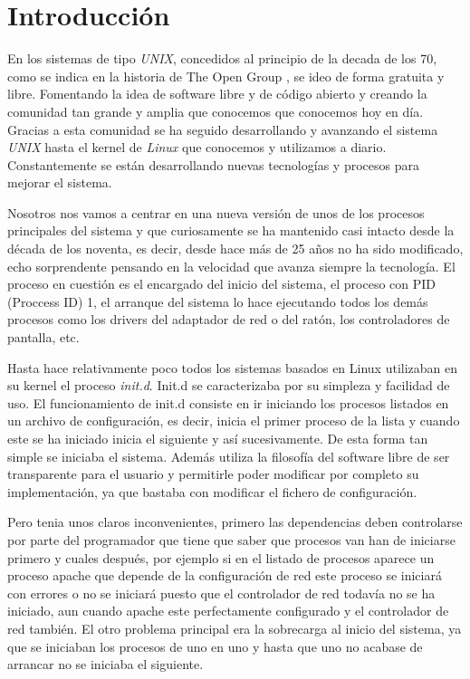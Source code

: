 \section{Introducción} %
En los sistemas de tipo \textit{UNIX}, concedidos al principio de la decada
de los 70, como se indica en la historia de The Open Group \cite{unix}, 
se ideo de forma gratuita y libre. Fomentando la idea de software libre
y de código abierto y creando la comunidad tan grande y amplia que conocemos 
que conocemos hoy en día. Gracias a esta comunidad se ha seguido
desarrollando y avanzando el sistema \textit{UNIX} hasta el kernel de 
\textit{Linux} que conocemos y utilizamos a diario. Constantemente se están
desarrollando nuevas tecnologías y procesos para mejorar el sistema.

Nosotros nos vamos a centrar en una nueva versión de unos de los procesos
principales del sistema y que curiosamente se ha mantenido casi intacto 
desde la década de los noventa, es decir, desde hace más de 25 años no
ha sido modificado, echo sorprendente pensando en la velocidad que avanza
siempre la tecnología. El proceso en cuestión es el encargado del inicio 
del sistema, el proceso con PID (Proccess ID) 1, el arranque del sistema 
lo hace ejecutando todos los demás procesos como los drivers del adaptador
de red o del ratón, los controladores de pantalla, etc. 

Hasta hace relativamente poco todos los sistemas basados en Linux 
utilizaban en su kernel el proceso \textit{init.d}. Init.d se caracterizaba
por su simpleza y facilidad de uso. El funcionamiento de init.d consiste
en ir iniciando los procesos listados en un archivo de configuración, 
es decir, inicia el primer proceso de la lista y cuando este se ha iniciado
inicia el siguiente y así sucesivamente. De esta forma tan simple se
iniciaba el sistema. Además utiliza la filosofía del software libre de 
ser transparente para el usuario y permitirle poder modificar por completo
su implementación, ya que bastaba con modificar el fichero de configuración.

Pero tenia unos claros inconvenientes, primero las dependencias
deben controlarse por parte del programador que tiene que saber que procesos
van han de iniciarse primero y cuales después, por ejemplo si en el listado
de procesos aparece un proceso apache que depende de la configuración de
red este proceso se iniciará con errores o no se iniciará puesto que el 
controlador de red todavía no se ha iniciado, aun cuando apache este 
perfectamente configurado y el controlador de red también. El otro
problema principal era la sobrecarga al inicio del sistema, ya que se 
iniciaban los procesos de uno en uno y hasta que uno no acabase de arrancar
no se iniciaba el siguiente.

